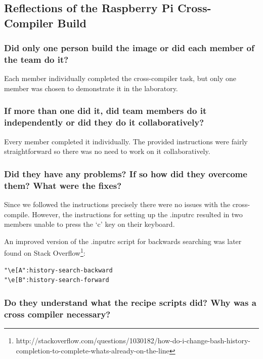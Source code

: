 \documentclass[11pt,a4paper,titlepage]{report}
\begin{document}
\begin{appendices}
\chapter{Reflections of the Raspberry Pi Cross-Compiler Build}

\subsection*{Did only one person build the image or did each member of the team do it?}

Each member individually completed the cross-compiler task, but only one member was chosen to demonstrate it in the laboratory.

\subsection*{If more than one did it, did team members do it independently or did they do it 
collaboratively?}

Every member completed it individually. The provided instructions were fairly straightforward so there was no need to work on it collaboratively.

\subsection*{Did they have any problems? If so how did they overcome them? What were 
the fixes?}

Since we followed the instructions precisely there were no issues with the cross-compile. However, the instructions for setting up the .inputrc resulted in two members unable to press the `c' key on their keyboard.

An improved version of the .inputrc script for backwards searching was later found on Stack Overflow\footnote{http://stackoverflow.com/questions/1030182/how-do-i-change-bash-history-completion-to-complete-whats-already-on-the-line}:

\begin{lstlisting}[frame=single]
"\e[A":history-search-backward
"\e[B":history-search-forward
\end{lstlisting}

\subsection*{Do they understand what the recipe scripts did? Why was a cross compiler 
necessary?}


\end{appendices}
\end{document}
